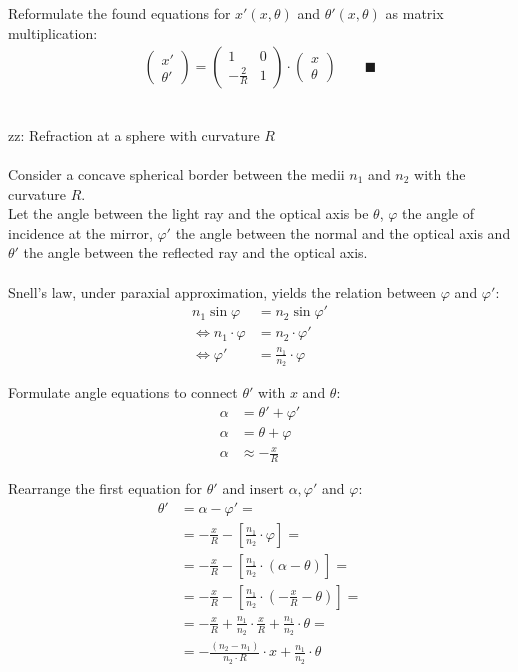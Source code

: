 \documentclass{article}
\newcommand{\lr}[1]{\left(#1\right)}
\newcommand{\lreck}[1]{\left[#1\right]}
\begin{document}
{	Reformulate the found equations for $x'(x,\theta)$ and $\theta'(x,\theta)$ as matrix multiplication:
		\begin{align*}
			\begin{pmatrix}
				x' \\ \theta'
			\end{pmatrix}
			=
			\begin{pmatrix}
				1 & 0 \\
				-\frac{2}{R} & 1
			\end{pmatrix}
			\cdot
			\begin{pmatrix}
				x \\ \theta
			\end{pmatrix}
			\qquad \blacksquare
		\end{align*}


	\\
	zz: Refraction at a sphere with curvature $R$\\
	\\
	Consider a concave spherical border between the medii $n_1$ and $n_2$ with the curvature $R$.\\
	Let the angle between the light ray and the optical axis be $\theta$, $\varphi$ the angle of incidence at the mirror, $\varphi'$ the angle between the normal and the optical axis and $\theta'$ the angle between the reflected ray and the optical axis.\\
	\\
	Snell's law, under paraxial approximation, yields the relation between $\varphi$ and $\varphi'$:
		\begin{align*}
			n_1 \sin \varphi &= n_2 \sin \varphi' \\
			\Leftrightarrow n_1 \cdot \varphi &= n_2 \cdot \varphi' \\
			\Leftrightarrow \varphi' &= \frac{n_1}{n_2} \cdot \varphi
		\end{align*}

	Formulate angle equations to connect $\theta'$ with $x$ and $\theta$:
		\begin{align*}
			\alpha &= \theta' + \varphi' \\
			\alpha &= \theta + \varphi \\
			\alpha &\approx -\frac{x}{R}
		\end{align*}


\newpage


	Rearrange the first equation for $\theta'$ and insert $\alpha, \varphi'$ and $\varphi$:
		\begin{align*}
			\theta' &= \alpha - \varphi' = \\
			&= -\frac{x}{R} - \lreck{ \frac{n_1}{n_2} \cdot \varphi } = \\
			&= -\frac{x}{R} - \lreck{ \frac{n_1}{n_2} \cdot \lr{ \alpha - \theta } } = \\
			&= -\frac{x}{R} - \lreck{ \frac{n_1}{n_2} \cdot \lr{ -\frac{x}{R} - \theta } } = \\
			&= - \frac{x}{R} + \frac{n_1}{n_2} \cdot \frac{x}{R} + \frac{n_1}{n_2} \cdot \theta = \\
			&= -\frac{(n_2 - n_1)}{n_2 \cdot R} \cdot x + \frac{n_1}{n_2} \cdot \theta
		\end{align*}
	
}
\end{document}
